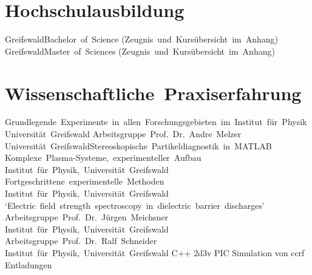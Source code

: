 \documentclass[11pt,a4paper]{moderncv}
\begin{document}
    \section{Hochschulausbildung}
        {Greifswald}{Bachelor~of~Science}{%
        (Zeugnis~und~Kursübersicht~im~Anhang)}
        {Greifswald}{Master~of~Sciences}{%
        (Zeugnis~und~Kursübersicht~im~Anhang)}
    \newpage
    \section{Wissenschaftliche~Praxiserfahrung}
        {Grundlegende~Experimente~in~allen~Forschungsgebieten~im~Institut~für~Physik\newline}{}%
        {Universität~Greifswald}{}
        {Arbeitsgruppe~Prof.~Dr.~Andre~Melzer\newline}{}%
        {Universität~Greifswald\newline}{Stereoskopische~Partikeldiagnostik~in~MATLAB}
        {Komplexe~Plasma-Systeme,~experimenteller~Aufbau\newline}{}%
        {Institut~für~Physik,~Universität~Greifswald}{}
        {Fortgeschrittene~experimentelle~Methoden\newline}{}%
        {Institut~für~Physik,~Universität~Greifswald}{}
        {`Electric~field~strength~spectroscopy~in~dielectric~barrier~discharges'\newline}{}%
        {Arbeitsgruppe~Prof.~Dr.~Jürgen~Meichsner\newline}%
        {Institut~für~Physik,~Universität~Greifswald}
        {Arbeitsgruppe~Prof.~Dr.~Ralf~Schneider\newline}{}%
        {Institut~für~Physik,~Universität~Greifswald\newline}%
        {C++ 2d3v PIC Simulation von ccrf Entladungen}
\end{document}
